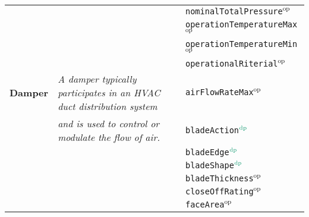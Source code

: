 {\begin{tabular}{lll}
                                  &                                                                                                        & \texttt{nominalTotalPressure}$^\textrm{op}$      \\
                                  &                                                                                                        & \texttt{operationTemperatureMax}$^\textrm{op}$   \\
                                  &                                                                                                        & \texttt{operationTemperatureMin}$^\textrm{op}$   \\
\textbf{}                         &                                                                                                        & \texttt{operationalRiterial}$^\textrm{op}$       \\ \midrule
\textbf{Damper}                   & \textit{A damper typically participates in an HVAC duct distribution system}                                    & \texttt{airFlowRateMax}$^\textrm{op}$            \\
                                  & \textit{and is used to control or modulate the flow of air.}                                                    & \texttt{bladeAction}$\color{DarkGreen}^\textrm{dp}$               \\
                                  &                                                                                                        & \texttt{bladeEdge}$\color{DarkGreen}^\textrm{dp}$                 \\
                                  &                                                                                                        & \texttt{bladeShape}$\color{DarkGreen}^\textrm{dp}$                \\
                                  &                                                                                                        & \texttt{bladeThickness}$^\textrm{op}$            \\
                                  &                                                                                                        & \texttt{closeOffRating}$^\textrm{op}$            \\
                                  &                                                                                                        & \texttt{faceArea}$^\textrm{op}$                  \\

\end{tabular}}
